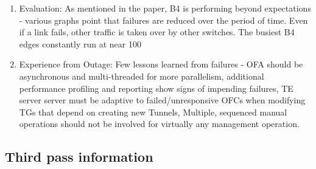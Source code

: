 \documentclass[letterpaper,twocolumn,10pt]{article}
\begin{document}
\begin{itemize}
\begin{enumerate}
\item Evaluation: As mentioned in the paper, B4 is performing beyond expectations - various graphs point that failures are reduced over the period of time. Even if a link fails, other traffic is taken over by other switches. The busiest B4 edges constantly run at near 100%
\item Experience from Outage: Few lessons learned from failures - OFA should be asynchronous and multi-threaded for more parallelism, additional performance profiling and reporting show signs of impending failures, TE server server must be adaptive to failed/unresponsive OFCs when modifying TGs that depend on creating new Tunnels, Multiple, sequenced manual operations should not be involved for virtually any management operation.

\end{enumerate}

\end{itemize}

\subsection{Third pass information}
\label{sec:third}
\end{document}
